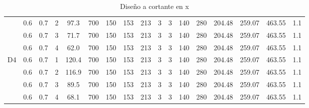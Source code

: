 \begin{table}[H]
{\begin{tabular}{|c|c|c|r|c|c|c|c|c|c|c|c|c|c|c|c|c|}
\cline{2-17}          & 0.6   & 0.7   & 2     & 97.3  & 700   & 150   & 153   & 213   & 3     & 3     & 140   & 280   & 204.48 & 259.07 & 463.55 & 1.1 \bigstrut\\
\cline{2-17}          & 0.6   & 0.7   & 3     & 71.7  & 700   & 150   & 153   & 213   & 3     & 3     & 140   & 280   & 204.48 & 259.07 & 463.55 & 1.1 \bigstrut\\
\cline{2-17}          & 0.6   & 0.7   & 4     & 62.0  & 700   & 150   & 153   & 213   & 3     & 3     & 140   & 280   & 204.48 & 259.07 & 463.55 & 1.1 \bigstrut\\
    \hline
    \multirow{4}[8]{*}{D4} & 0.6   & 0.7   & 1     & 120.4 & 700   & 150   & 153   & 213   & 3     & 3     & 140   & 280   & 204.48 & 259.07 & 463.55 & 1.1 \bigstrut\\
\cline{2-17}          & 0.6   & 0.7   & 2     & 116.9 & 700   & 150   & 153   & 213   & 3     & 3     & 140   & 280   & 204.48 & 259.07 & 463.55 & 1.1 \bigstrut\\
\cline{2-17}          & 0.6   & 0.7   & 3     & 89.5  & 700   & 150   & 153   & 213   & 3     & 3     & 140   & 280   & 204.48 & 259.07 & 463.55 & 1.1 \bigstrut\\
\cline{2-17}          & 0.6   & 0.7   & 4     & 68.1  & 700   & 150   & 153   & 213   & 3     & 3     & 140   & 280   & 204.48 & 259.07 & 463.55 & 1.1 \bigstrut\\
    \hline
    \end{tabular}}%
  \caption{Diseño a cortante en x}
  \label{tab:Cortantex}%
\end{table}%


